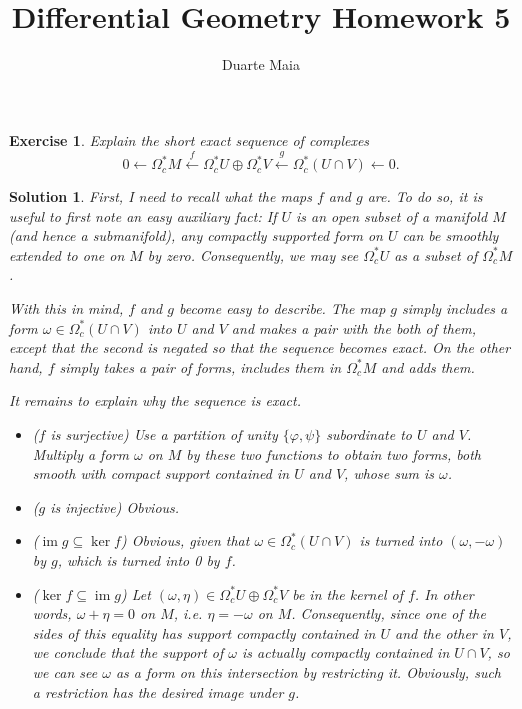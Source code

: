 \documentclass{article}
\title{Differential Geometry Homework 5}
\author{Duarte Maia}
\date{}
\newtheorem{ex}{Exercise}
\theoremstyle{nonumberplain}
\newtheorem{sol}{Solution}
\DeclareMathOperator{\im}{im}
\begin{document}
\maketitle

\begin{ex}
Explain the short exact sequence of complexes
\[0 \leftarrow \Omega^*_c M \xleftarrow{f} \Omega^*_c U \oplus \Omega^*_c V \xleftarrow{g} \Omega^*_c (U \cap V) \leftarrow 0.\]
\end{ex}

\begin{sol}
First, I need to recall what the maps $f$ and $g$ are. To do so, it is useful to first note an easy auxiliary fact: If $U$ is an open subset of a manifold $M$ (and hence a submanifold), any compactly supported form on $U$ can be smoothly extended to one on $M$ by zero. Consequently, we may see $\Omega^*_c U$ as a subset of $\Omega^*_c M$.

With this in mind, $f$ and $g$ become easy to describe. The map $g$ simply includes a form $\omega \in \Omega^*_c(U \cap V)$ into $U$ and $V$ and makes a pair with the both of them, except that the second is negated so that the sequence becomes exact. On the other hand, $f$ simply takes a pair of forms, includes them in $\Omega^*_c M$ and adds them.

It remains to explain why the sequence is exact.

\begin{itemize}
\item ($f$ is surjective) Use a partition of unity $\{\varphi, \psi\}$ subordinate to $U$ and $V$. Multiply a form $\omega$ on $M$ by these two functions to obtain two forms, both smooth with compact support contained in $U$ and $V$, whose sum is $\omega$.

\item ($g$ is injective) Obvious.

\item ($\im g \subseteq \ker f$) Obvious, given that $\omega \in \Omega^*_c(U \cap V)$ is turned into $(\omega,-\omega)$ by $g$, which is turned into 0 by $f$.

\item ($\ker f \subseteq \im g$) Let $(\omega,\eta) \in \Omega^*_c U \oplus \Omega^*_c V$ be in the kernel of $f$. In other words, $\omega+\eta=0$ on $M$, i.e. $\eta = -\omega$ on $M$. Consequently, since one of the sides of this equality has support compactly contained in $U$ and the other in $V$, we conclude that the support of $\omega$ is actually compactly contained in $U \cap V$, so we can see $\omega$ as a form on this intersection by restricting it. Obviously, such a restriction has the desired image under $g$.
\end{itemize}
\end{sol}
\end{document}
